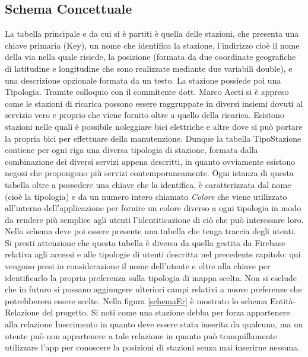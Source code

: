 \subsection{Schema Concettuale}
 La tabella principale e da cui si è partiti è
quella delle stazioni, che presenta una chiave primaria (Key), un nome che
identifica la stazione, l'indirizzo cioè il nome della via nella quale risiede, la
posizione (formata da due coordinate geografiche di latitudine e longitudine che
sono realizzate mediante due variabili double), e
una descrizione opzionale formata da un testo. La
stazione possiede poi una Tipologia. Tramite colloquio con il commitente dott.
Marco  Aceti si è appreso come le stazioni di ricarica possono essere
raggruppate
in diversi insiemi dovuti al servizio vero e proprio che viene fornito oltre a
quello della ricarica. Esistono stazioni nelle quali è possibile noleggiare bici
elettriche e altre dove si può portare la propria bici per effettuare della manutenzione.
Dunque la tabella TipoStazione contiene per ogni riga una diversa tipologia di
stazione, formata dalla combinazione dei diversi servizi appena descritti, in
quanto ovviamente esistono negozi che propongono più servizi contemporaneamente.
Ogni istanza di questa tabella oltre a possedere una chiave che la identifica,
è caratterizzata dal nome (cioè la tipologia) e da un numero intero chiamato
\textit{Colore} che viene utilizzato all'interno dell'applicazione per fornire un colore
diverso a ogni tipologia in modo da rendere più semplice agli utenti
l'identiticazione di ciò che può interessare loro. Nello schema deve poi essere
presente una tabella che tenga traccia degli utenti. Si presti attenzione che
questa tabella è diversa da quella gestita da Firebase relativa agli accessi e
alle tipologie di utenti descritta nel precedente capitolo: qui vengono presi in
considerazione il nome dell'utente e oltre alla chiave per identificarlo la
propria preferenza sulla tipologia di mappa scelta. Non si esclude che in futuro
si possano aggiungere ulteriori campi relativi a nuove preferenze che
potrebberero essere scelte. Nella figura \ref{schemaEr} è mostrato lo schema Entità-Relazione
del progetto. Si noti come una stazione debba per forza appartenere alla
relazione Inserimento in quanto deve essere stata inserita da qualcuno, ma un
utente può non appartenere a tale relazione in quanto può tranquillamente
utilizzare l'app per conoscere la posizioni di stazioni senza mai inserirne nessuna.

